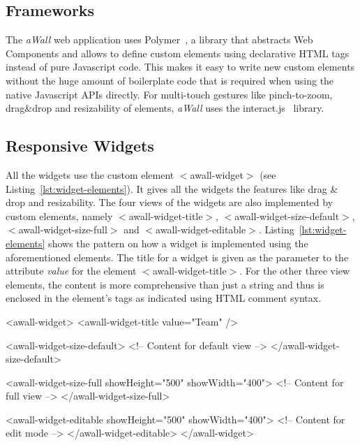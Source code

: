\documentclass{sigchi}
\begin{document}
\subsection{Frameworks}
The \textit{aWall} web application uses Polymer~\cite{polymer}, a library that abstracts Web Components and allows to define custom elements using declarative HTML tags instead of pure Javascript code.
This makes it easy to write new custom elements without the huge amount of boilerplate code that is required when using the native Javascript APIs directly.
For multi-touch gestures like pinch-to-zoom, drag\&drop and resizability of elements, \textit{aWall} uses the interact.js~\cite{interactJs} library.

\subsection{Responsive Widgets}
All the widgets use the custom element $<$awall-widget$>$ (see Listing~\ref{lst:widget-elements}).
It gives all the widgets the features like drag \& drop and resizability.
The four views of the widgets are also implemented by custom elements, namely $<$awall-widget-title$>$, $<$awall-widget-size-default$>$, $<$awall-widget-size-full$>$ and $<$awall-widget-editable$>$.
Listing~\ref{lst:widget-elements} shows the pattern on how a widget is implemented using the aforementioned elements.
The title for a widget is given as the parameter to the attribute \textit{value} for the element $<$awall-widget-title$>$.
For the other three view elements, the content is more comprehensive than just a string and thus is enclosed in the element's tags as indicated using HTML comment syntax.

\begin{code}[caption={HTML elements for the widget's different views.},label=lst:widget-elements]
<awall-widget>
  <awall-widget-title value="Team" />

  <awall-widget-size-default>
    <!-- Content for default view -->
  </awall-widget-size-default>

  <awall-widget-size-full showHeight="500" showWidth="400">
    <!-- Content for full view -->
  </awall-widget-size-full>

  <awall-widget-editable showHeight="500" showWidth="400">
    <!-- Content for edit mode -->
  </awall-widget-editable>
</awall-widget>
\end{code}
\end{document}
